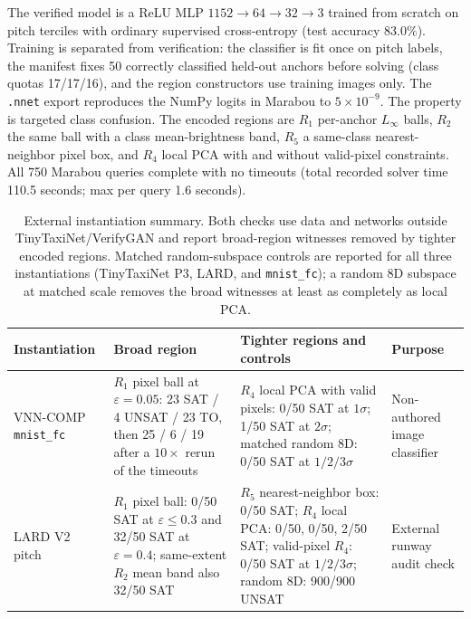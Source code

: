 \documentclass[twocolumn,smallextended,runningheads]{svjour3}
\newcommand{\sttttablefont}{\footnotesize}
\begin{document}
The verified model is a ReLU MLP $1152\to64\to32\to3$ trained from scratch on pitch terciles with ordinary supervised cross-entropy (test accuracy $83.0\%$). Training is separated from verification: the classifier is fit once on pitch labels, the manifest fixes 50 correctly classified held-out anchors before solving (class quotas 17/17/16), and the region constructors use training images only. The \texttt{.nnet} export reproduces the NumPy logits in Marabou to $5\times10^{-9}$. The property is targeted class confusion. The encoded regions are $R_1$ per-anchor $L_\infty$ balls, $R_2$ the same ball with a class mean-brightness band, $R_5$ a same-class nearest-neighbor pixel box, and $R_4$ local PCA with and without valid-pixel constraints. All 750 Marabou queries complete with no timeouts (total recorded solver time 110.5 seconds; max per query 1.6 seconds).

\begin{table}[t]
\centering
\sttttablefont
\setlength{\tabcolsep}{4pt}
\begin{tabular}{@{}p{}p{}p{}p{}@{}}
\toprule
Instantiation & Broad region & Tighter regions and controls & Purpose \\
\midrule
VNN-COMP \texttt{mnist\_fc} & $R_1$ pixel ball at $\varepsilon=0.05$: 23 SAT / 4 UNSAT / 23 TO, then 25 / 6 / 19 after a $10\times$ rerun of the timeouts & $R_4$ local PCA with valid pixels: 0/50 SAT at $1\sigma$; 1/50 SAT at $2\sigma$; matched random 8D: 0/50 SAT at $1/2/3\sigma$ & Non-authored image classifier \\
LARD V2 pitch & $R_1$ pixel ball: 0/50 SAT at $\varepsilon\le0.3$ and 32/50 SAT at $\varepsilon=0.4$; same-extent $R_2$ mean band also 32/50 SAT & $R_5$ nearest-neighbor box: 0/50 SAT; $R_4$ local PCA: 0/50, 0/50, 2/50 SAT; valid-pixel $R_4$: 0/50 SAT at $1/2/3\sigma$; random 8D: 900/900 UNSAT & External runway audit check \\
\bottomrule
\end{tabular}
\caption{External instantiation summary. Both checks use data and networks outside TinyTaxiNet/VerifyGAN and report broad-region witnesses removed by tighter encoded regions. Matched random-subspace controls are reported for all three instantiations (TinyTaxiNet P3, LARD, and \texttt{mnist\_fc}); a random 8D subspace at matched scale removes the broad witnesses at least as completely as local PCA.}
\label{tab:external_instantiations}
\end{table}
\end{document}
